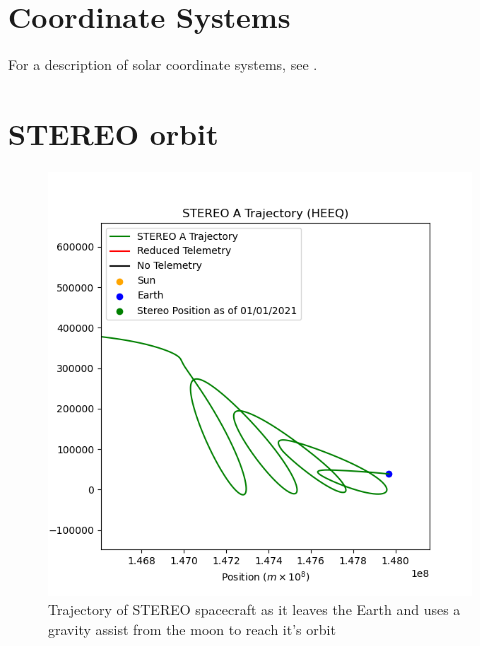 \documentclass[11pt,a4paper,onecolumn]{report}
\begin{document}








\appendix

\chapter{Coordinate Systems}
For a description of solar coordinate systems, see
\citet{thompson_w_t_coordinate_2006}.

\chapter{STEREO orbit}
\label{app:fun orbit}
\begin{figure}[ht]
  \centering
  \includegraphics[width=0.8\linewidth]{fun_orbit.png}
  \caption{Trajectory of STEREO spacecraft as it leaves the Earth and uses a gravity assist from the moon to reach it's orbit}
  \label{fig:fun_orbit}
\end{figure}
\end{document}
